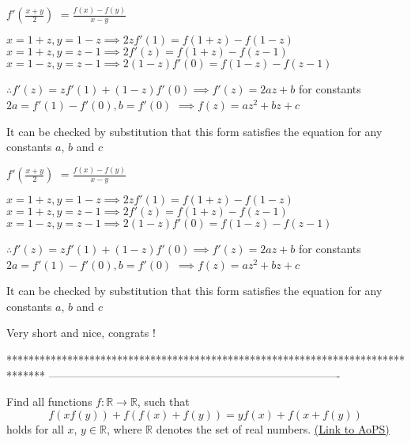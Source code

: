 \begin{solution}
	$ f'(\frac {x + y}{2})$ $ = \frac {f(x) - f(y)}{x - y}$

$ x = 1 + z, y = 1 - z \implies 2zf'(1) = f(1 + z) - f(1 - z)$
$ x = 1 + z, y = z - 1 \implies 2f'(z) = f(1 + z) - f(z - 1)$
$ x = 1 - z, y = z - 1 \implies 2(1 - z)f'(0) = f(1 - z) - f(z - 1)$

$ \therefore f'(z) = zf'(1) + (1-z)f'(0)  \implies f'(z) = 2az + b$ for constants $ 2a = f'(1) -f'(0), b = f'(0)$
$ \implies \boxed{f(z) = az^2 + bz + c}$

It can be checked by substitution that this form satisfies the equation for any constants $ a$, $ b$ and $ c$
\end{solution}



\begin{solution}
	\begin{tcolorbox}$ f'(\frac {x + y}{2})$ $ = \frac {f(x) - f(y)}{x - y}$

$ x = 1 + z, y = 1 - z \implies 2zf'(1) = f(1 + z) - f(1 - z)$
$ x = 1 + z, y = z - 1 \implies 2f'(z) = f(1 + z) - f(z - 1)$
$ x = 1 - z, y = z - 1 \implies 2(1 - z)f'(0) = f(1 - z) - f(z - 1)$

$ \therefore f'(z) = zf'(1) + (1 - z)f'(0) \implies f'(z) = 2az + b$ for constants $ 2a = f'(1) - f'(0), b = f'(0)$
$ \implies \boxed{f(z) = az^2 + bz + c}$

It can be checked by substitution that this form satisfies the equation for any constants $ a$, $ b$ and $ c$\end{tcolorbox}

Very short and nice, congrats !
\end{solution}
*******************************************************************************
-------------------------------------------------------------------------------

\begin{problem}
	Find all functions $ f: \mathbb{R} \to \mathbb{R}$, such that
\[ f(xf(y)) + f(f(x) + f(y)) = yf(x) + f(x + f(y))\]
holds for all $ x$, $ y \in \mathbb{R}$, where $ \mathbb{R}$ denotes the set of real numbers.
	\flushright \href{https://artofproblemsolving.com/community/c6h303622}{(Link to AoPS)}
\end{problem}



